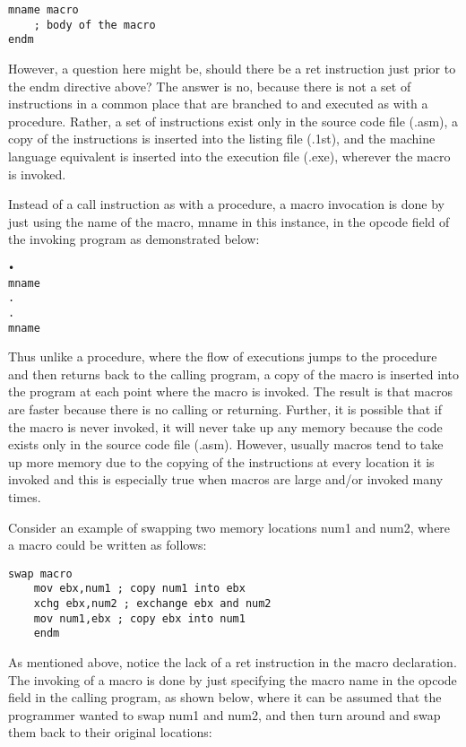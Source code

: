 \documentclass[10pt]{article}
\begin{document}
\begin{verbatim}
mname macro
    ; body of the macro
endm
\end{verbatim}

However, a question here might be, should there be a ret instruction just prior to the endm directive above? The answer is no, because there is not a set of instructions in a common place that are branched to and executed as with a procedure. Rather, a set of instructions exist only in the source code file (.asm), a copy of the instructions is inserted into the listing file (.1st), and the machine language equivalent is inserted into the execution file (.exe), wherever the macro is invoked.

Instead of a call instruction as with a procedure, a macro invocation is done by just using the name of the macro, mname in this instance, in the opcode field of the invoking program as demonstrated below:

\begin{verbatim}
•
mname
.
.
mname
\end{verbatim}

Thus unlike a procedure, where the flow of executions jumps to the procedure and then returns back to the calling program, a copy of the macro is inserted into the program at each point where the macro is invoked. The result is that macros are faster because there is no calling or returning. Further, it is possible that if the macro is never invoked, it will never take up any memory because the code exists only in the source code file (.asm). However, usually macros tend to take up more memory due to the copying of the instructions at every location it is invoked and this is especially true when macros are large and/or invoked many times.

Consider an example of swapping two memory locations num1 and num2, where a macro could be written as follows:

\begin{verbatim}
swap macro
    mov ebx,num1 ; copy num1 into ebx
    xchg ebx,num2 ; exchange ebx and num2
    mov num1,ebx ; copy ebx into num1
    endm
\end{verbatim}

As mentioned above, notice the lack of a ret instruction in the macro declaration. The invoking of a macro is done by just specifying the macro name in the opcode field in the calling program, as shown below, where it can be assumed that the programmer wanted to swap num1 and num2, and then turn around and swap them back to their original locations:
\end{document}
